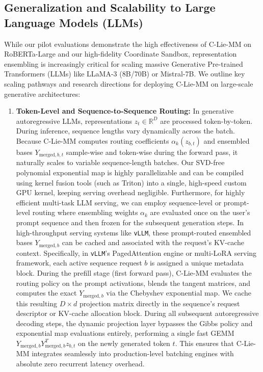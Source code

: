 \documentclass{article}
\theoremstyle{plain}
\theoremstyle{definition}
\theoremstyle{remark}
\begin{document}
\subsection{Generalization and Scalability to Large Language Models (LLMs)}
While our pilot evaluations demonstrate the high effectiveness of C-Lie-MM on RoBERTa-Large and our high-fidelity Coordinate Sandbox, representation ensembling is increasingly critical for scaling massive Generative Pre-trained Transformers (LLMs) like LLaMA-3 (8B/70B) or Mistral-7B. We outline key scaling pathways and research directions for deploying C-Lie-MM on large-scale generative architectures:

\begin{enumerate}
    \item \textbf{Token-Level and Sequence-to-Sequence Routing:} In generative autoregressive LLMs, representations $z_t \in \mathbb{R}^D$ are processed token-by-token. During inference, sequence lengths vary dynamically across the batch. Because C-Lie-MM computes routing coefficients $\alpha_k(z_{b,t})$ and ensembled bases $Y_{\text{merged}, b, t}$ sample-wise and token-wise during the forward pass, it naturally scales to variable sequence-length batches. Our SVD-free polynomial exponential map is highly parallelizable and can be compiled using kernel fusion tools (such as Triton) into a single, high-speed custom GPU kernel, keeping serving overhead negligible. Furthermore, for highly efficient multi-task LLM serving, we can employ sequence-level or prompt-level routing where ensembling weights $\alpha_k$ are evaluated once on the user's prompt sequence and then frozen for the subsequent generation steps. In high-throughput serving systems like \texttt{vLLM}, these prompt-routed ensembled bases $Y_{\text{merged}, b}$ can be cached and associated with the request's KV-cache context. Specifically, in \texttt{vLLM}'s PagedAttention engine or multi-LoRA serving framework, each active sequence request $b$ is assigned a unique metadata block. During the prefill stage (first forward pass), C-Lie-MM evaluates the routing policy on the prompt activations, blends the tangent matrices, and computes the exact $Y_{\text{merged}, b}$ via the Chebyshev exponential map. We cache this resulting $D \times d$ projection matrix directly in the sequence's request descriptor or KV-cache allocation block. During all subsequent autoregressive decoding steps, the dynamic projection layer bypasses the Gibbs policy and exponential map evaluations entirely, performing a single fast GEMM $Y_{\text{merged}, b} Y_{\text{merged}, b}^T z_{b, t}$ on the newly generated token $t$. This ensures that C-Lie-MM integrates seamlessly into production-level batching engines with absolute zero recurrent latency overhead.

\end{enumerate}
\end{document}
